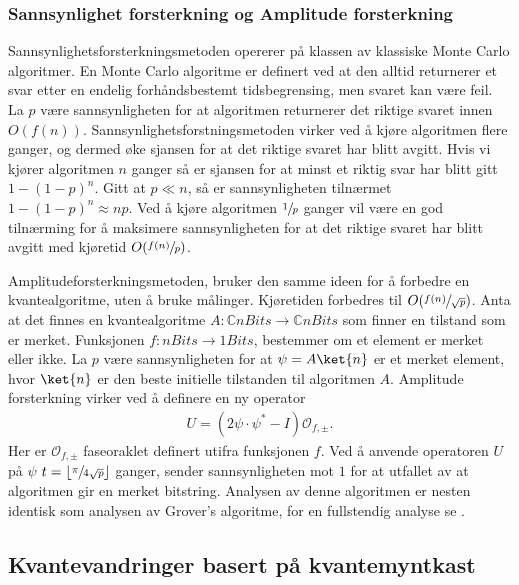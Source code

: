     \subsubsection{Sannsynlighet forsterkning og Amplitude forsterkning}

        Sannsynlighetsforsterkningsmetoden opererer på klassen av klassiske Monte Carlo algoritmer. En Monte Carlo algoritme er definert ved at den alltid returnerer et svar etter en endelig forhåndsbestemt tidsbegrensing, men svaret kan være feil. La $p$ være sannsynligheten for at algoritmen returnerer det riktige svaret innen $O(f(n))$. Sannsynlighetsforstningsmetoden virker ved å kjøre algoritmen flere ganger, og dermed øke sjansen for at det riktige svaret har blitt avgitt. Hvis vi kjører algoritmen $n$ ganger så er sjansen for at minst et riktig svar har blitt gitt $1-(1-p)^n$. Gitt at $p\ll n$, så er sannsynligheten tilnærmet $1-(1-p)^n\approx np$. Ved å kjøre algoritmen $\sfrac{1}{p}$ ganger vil være en god tilnærming for å maksimere sannsynligheten for at det riktige svaret har blitt avgitt med kjøretid $O(\sfrac{f(n)}{p})$.
        
        Amplitudeforsterkningsmetoden, bruker den samme ideen for å forbedre en kvantealgoritme, uten å bruke målinger. Kjøretiden forbedres til $O(\sfrac{f(n)}{\sqrt{p}})$. Anta at det finnes en kvantealgoritme $A:\mathbb{C}nBits\rightarrow\mathbb{C}nBits$ som finner en tilstand som er merket. Funksjonen $f:nBits\rightarrow 1Bits$, bestemmer om et element er merket eller ikke. La $p$ være sannsynligheten for at $\psi = A\ket{n}$ er et merket element, hvor $\ket{n}$ er den beste initielle tilstanden til algoritmen $A$. Amplitude forsterkning virker ved å definere en ny operator
        \begin{align*}
            U = (2\psi\cdot\psi^*-I)\mathcal{O}_{f,\pm}.
        \end{align*}
        Her er $\mathcal{O}_{f,\pm}$ faseoraklet definert utifra funksjonen $f$. Ved å anvende operatoren $U$ på $\psi$ $t=\lfloor\sfrac{\pi}{4\sqrt{p}}\rfloor$ ganger, sender sannsynligheten mot $1$ for at utfallet av at algoritmen gir en merket bitstring. Analysen av denne algoritmen er nesten identisk som analysen av Grover's algoritme, for en fullstendig analyse se \cite{portugal_2019}.

\subsection{Kvantevandringer basert på kvantemyntkast}

